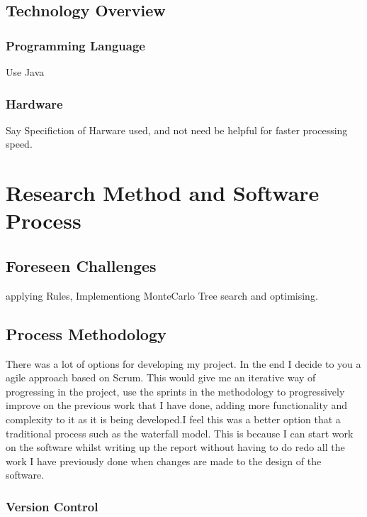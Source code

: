 \subsection {Technology Overview}
\subsubsection{Programming Language}
Use Java
\subsubsection{Hardware}
Say Specifiction of Harware used, and not need be helpful for faster processing speed.
\section{Research Method and Software Process}
\subsection {Foreseen Challenges}
applying Rules, Implementiong MonteCarlo Tree search and optimising.
\subsection {Process Methodology}
There was a lot of options for developing my project. In the end I decide to you a agile approach based on Scrum. This would give me an iterative way of progressing in the project, use the sprints in the methodology to progressively improve on the previous work that I have done, adding more functionality and complexity to it as it is being developed.I feel this was a better option that a traditional process such as the waterfall model. This is because I can start work on the software whilst writing up the report without having to do redo all the work I have previously done when changes are made to the design of the software.
\subsubsection{Version Control}


